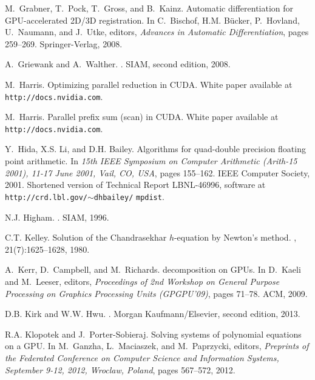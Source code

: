 \documentclass{article}
\begin{document}
\begin{thebibliography}{10}
M.~Grabner, T.~Pock, T.~Gross, and B.~Kainz.
\newblock Automatic differentiation for {GPU}-accelerated {2D/3D} registration.
\newblock In C.~Bischof, H.M. B{\"{u}}cker, P.~Hovland, U.~Naumann, and
  J.~Utke, editors, {\em Advances in Automatic Differentiation}, pages
  259--269. Springer-Verlag, 2008.

A.~Griewank and A.~Walther.
.
\newblock SIAM, second edition, 2008.

M.~Harris.
\newblock Optimizing parallel reduction in {CUDA}.
\newblock White paper available at {\tt http://docs.nvidia.com}.

M.~Harris.
\newblock Parallel prefix sum (scan) in {CUDA}.
\newblock White paper available at {\tt http://docs.nvidia.com}.

Y.~Hida, X.S. Li, and D.H. Bailey.
\newblock Algorithms for quad-double precision floating point arithmetic.
\newblock In {\em {15th IEEE Symposium on Computer Arithmetic (Arith-15 2001),
  11-17 June 2001, Vail, CO, USA}}, pages 155--162. IEEE Computer Society,
  2001.
\newblock Shortened version of Technical Report LBNL-46996, software at {\tt
  http://crd.lbl.gov/$\sim$dhbailey/} {\tt mpdist}.

N.J. Higham.
.
\newblock SIAM, 1996.

C.T. Kelley.
\newblock Solution of the {C}handrasekhar $h$-equation by {N}ewton's method.
, 21(7):1625--1628, 1980.

A.~Kerr, D.~Campbell, and M.~Richards.
 decomposition on {GPU}s.
\newblock In D.~Kaeli and M.~Leeser, editors, {\em Proceedings of 2nd Workshop
  on General Purpose Processing on Graphics Processing Units (GPGPU'09)}, pages
  71--78. ACM, 2009.

D.B. Kirk and W.W. Hwu.
.
\newblock Morgan Kaufmann/Elsevier, second edition, 2013.

R.A. Klopotek and J.~Porter-Sobieraj.
\newblock Solving systems of polynomial equations on a {GPU}.
\newblock In M.~Ganzha, L.~Maciaszek, and M.~Paprzycki, editors, {\em Preprints
  of the Federated Conference on Computer Science and Information Systems,
  September 9-12, 2012, Wroclaw, Poland}, pages 567--572, 2012.


\end{thebibliography}
\end{document}
